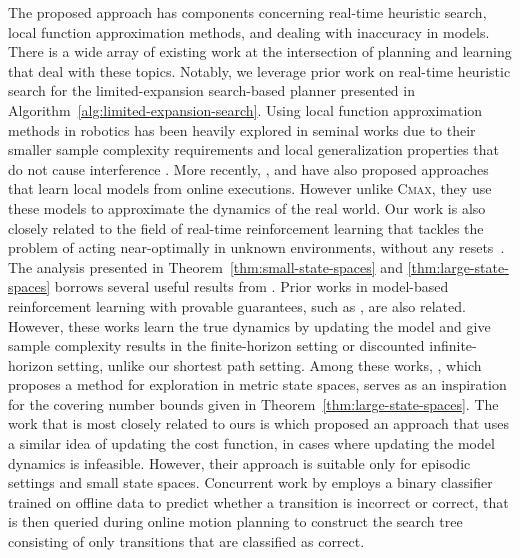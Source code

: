 The proposed approach has components concerning real-time heuristic
search, local function approximation methods, and dealing with
inaccuracy in models. There is a wide array of existing work at the
intersection of planning and learning that deal with these
topics. Notably, we leverage prior 
work on real-time heuristic search \cite{DBLP:journals/ai/Korf90,
  DBLP:conf/atal/KoenigL06} for the limited-expansion search-based
planner presented in
Algorithm~\ref{alg:limited-expansion-search}. Using local function
approximation methods in
robotics has been heavily explored in seminal works \cite{
DBLP:conf/icml/VijayakumarS00, DBLP:conf/icra/AtkesonS97} due to their smaller sample complexity
requirements and local generalization properties that do not cause
interference \cite{DBLP:journals/air/AtkesonMS97a,
  DBLP:conf/icml/CoatesAN08}. More recently,
\cite{DBLP:conf/atal/JongS07}, 
\cite{DBLP:conf/nips/NouriL08} and \cite{DBLP:journals/ml/BernsteinS10} have also proposed approaches that
learn local models from online executions. However unlike \textsc{Cmax},
they use these models to approximate the dynamics of the real world. Our work is also closely related to
the field of real-time reinforcement learning that tackles the problem
of acting near-optimally in unknown environments, without any resets~\cite{DBLP:journals/sigart/Sutton91, DBLP:journals/ai/BartoBS95, DBLP:conf/aaai/KoenigS93}. The analysis presented in
Theorem~\ref{thm:small-state-spaces} and \ref{thm:large-state-spaces} borrows several useful results
from \cite{DBLP:conf/aaai/KoenigS93}. Prior
works in model-based reinforcement learning with provable guarantees,
such as \cite{DBLP:journals/ml/KearnsS02, DBLP:journals/ml/BernsteinS10,
  DBLP:journals/jmlr/BrafmanT02, DBLP:conf/icml/KakadeKL03}, are also
related. However, these works learn the true
dynamics by updating the model and give sample complexity results in
the finite-horizon setting or discounted infinite-horizon setting,
unlike our shortest path setting. Among these works,
\cite{DBLP:conf/icml/KakadeKL03}, which proposes a method for exploration in metric
state spaces, serves as an inspiration for the covering number
bounds given in
Theorem~\ref{thm:large-state-spaces}. The work that is most closely
related to ours is \cite{DBLP:conf/aaai/Jiang18}
which proposed an approach that uses a similar idea of updating the cost
function, in cases where updating the model dynamics is infeasible. However, their
approach is suitable only for episodic settings and small state
spaces. Concurrent work by \cite{DBLP:journals/ral/McConachiePMB20}
employs a binary classifier trained on offline data to predict whether
a transition is incorrect or correct, that is then queried during
online motion planning to construct the search tree consisting of only
transitions that are classified as correct.

